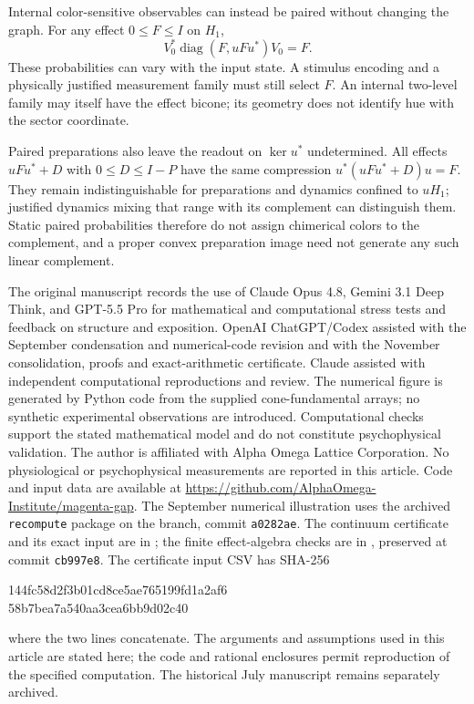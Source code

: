 \documentclass[9pt,twocolumn,twoside]{opticajnl}
\theoremstyle{plain}
\begin{document}
Internal color-sensitive observables can instead be paired without changing the graph. For any effect $0\leq F\leq I$ on $H_1$,
\begin{equation}
 V_0^*\operatorname{diag}(F,uFu^*)V_0=F.
 \label{eq:paired-internal-effect}
\end{equation}
These probabilities can vary with the input state. A stimulus encoding and a physically justified measurement family must still select $F$. An internal two-level family may itself have the effect bicone; its geometry does not identify hue with the sector coordinate.

Paired preparations also leave the readout on $\ker u^*$ undetermined. All effects $uFu^*+D$ with $0\leq D\leq I-P$ have the same compression $u^*(uFu^*+D)u=F$. They remain indistinguishable for preparations and dynamics confined to $uH_1$; justified dynamics mixing that range with its complement can distinguish them. Static paired probabilities therefore do not assign chimerical colors to the complement, and a proper convex preparation image need not generate any such linear complement.

\begin{backmatter}
The original manuscript records the use of Claude Opus 4.8, Gemini 3.1 Deep Think, and GPT-5.5 Pro for mathematical and computational stress tests and feedback on structure and exposition. OpenAI ChatGPT/Codex assisted with the September condensation and numerical-code revision and with the November consolidation, proofs and exact-arithmetic certificate. Claude assisted with independent computational reproductions and review. The numerical figure is generated by Python code from the supplied cone-fundamental arrays; no synthetic experimental observations are introduced. Computational checks support the stated mathematical model and do not constitute psychophysical validation.
The author is affiliated with Alpha Omega Lattice Corporation. No physiological or psychophysical measurements are reported in this article.
Code and input data are available at \url{https://github.com/AlphaOmega-Institute/magenta-gap}. The September numerical illustration uses the archived \texttt{recompute} package on the  branch, commit \texttt{a0282ae}. The continuum certificate and its exact input are in ; the finite effect-algebra checks are in , preserved at commit \texttt{cb997e8}. The certificate input CSV has SHA-256
\begin{center}\scriptsize\ttfamily
144fc58d2f3b01cd8ce5ae765199fd1a2af6\\
58b7bea7a540aa3cea6bb9d02c40
\end{center}
where the two lines concatenate. The arguments and assumptions used in this article are stated here; the code and rational enclosures permit reproduction of the specified computation. The historical July manuscript remains separately archived.
\end{backmatter}
\end{document}
